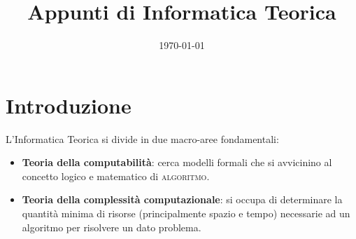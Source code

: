 \documentclass{article}
\title{Appunti di Informatica Teorica}
\author{} %
\date{\today}
\theoremstyle{break}
\theoremstyle{definition}
\begin{document}
\maketitle

\tableofcontents

\newpage %


\section{Introduzione}

L'Informatica Teorica si divide in due macro-aree fondamentali:

\begin{itemize}
    \item \textbf{Teoria della computabilità}: cerca modelli formali che si avvicinino al concetto logico e matematico di \textsc{algoritmo}.
    \item \textbf{Teoria della complessità computazionale}: si occupa di determinare la quantità minima di risorse (principalmente spazio e tempo) necessarie ad un algoritmo per risolvere un dato problema.
\end{itemize}



\end{document}
